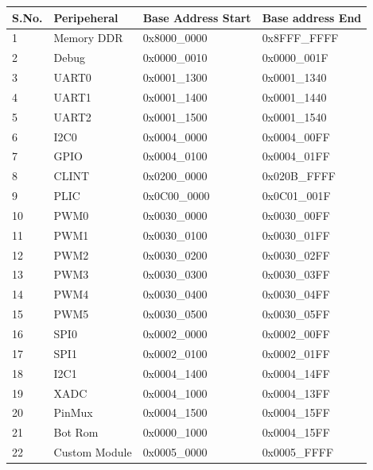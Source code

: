 \begin{table}[]
	\centering
	\begin{tabular}{|l|l|l|l|}
	\hline
	S.No. & Peripeheral   & Base Address Start & Base address End \\ \hline
	1     & Memory DDR    & 0x8000\_0000       & 0x8FFF\_FFFF     \\ \hline
	2     & Debug         & 0x0000\_0010       & 0x0000\_001F     \\ \hline
	3     & UART0         & 0x0001\_1300       & 0x0001\_1340     \\ \hline
	4     & UART1         & 0x0001\_1400       & 0x0001\_1440     \\ \hline
	5     & UART2         & 0x0001\_1500       & 0x0001\_1540     \\ \hline
	6     & I2C0          & 0x0004\_0000       & 0x0004\_00FF     \\ \hline
	7     & GPIO          & 0x0004\_0100       & 0x0004\_01FF     \\ \hline
	8     & CLINT         & 0x0200\_0000       & 0x020B\_FFFF     \\ \hline
	9     & PLIC          & 0x0C00\_0000       & 0x0C01\_001F     \\ \hline
	10    & PWM0          & 0x0030\_0000       & 0x0030\_00FF     \\ \hline
	11    & PWM1          & 0x0030\_0100       & 0x0030\_01FF     \\ \hline
	12    & PWM2          & 0x0030\_0200       & 0x0030\_02FF     \\ \hline
	13    & PWM3          & 0x0030\_0300       & 0x0030\_03FF     \\ \hline
	14    & PWM4          & 0x0030\_0400       & 0x0030\_04FF     \\ \hline
	15    & PWM5          & 0x0030\_0500       & 0x0030\_05FF     \\ \hline
	16    & SPI0          & 0x0002\_0000       & 0x0002\_00FF     \\ \hline
	17    & SPI1          & 0x0002\_0100       & 0x0002\_01FF     \\ \hline
	18    & I2C1          & 0x0004\_1400       & 0x0004\_14FF     \\ \hline
	19    & XADC          & 0x0004\_1000       & 0x0004\_13FF     \\ \hline
	20    & PinMux        & 0x0004\_1500       & 0x0004\_15FF     \\ \hline
	21    & Bot Rom       & 0x0000\_1000       & 0x0004\_15FF     \\ \hline
	22    & Custom Module & 0x0005\_0000       & 0x0005\_FFFF     \\ \hline
	\end{tabular}
\end{table}

